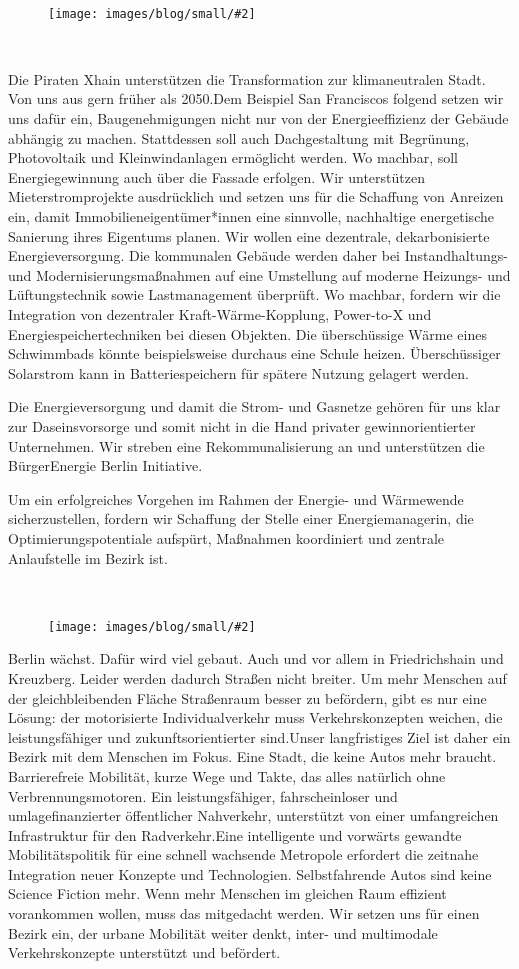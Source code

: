 \documentclass[a4paper,10pt]{article}
\newcommand{\mysection}[1]{{\vspace{1cm}\noindent\color{gray}{\ttfamily\LARGE\raggedright #1}\\\medskip}}
\newcommand{\abschnitt}[2]{%
\mysection{\raggedright #1}%
\begin{figure}[t]%
\vspace*{-2.7cm}%
\hspace*{-2.1cm}%
\texttt{[image: images/blog/small/\#2]} %
\end{figure}%
}
\begin{document}
\abschnitt{}{establishment.png}
\mysection{Energiewende}
\vspace*{-1.5cm}

Die Piraten Xhain unterstützen die Transformation zur klimaneutralen
Stadt. Von uns aus gern früher als 2050.Dem Beispiel San Franciscos
folgend setzen wir uns dafür ein, Baugenehmigungen nicht nur von der
Energieeffizienz der Gebäude abhängig zu machen. Stattdessen soll auch
Dachgestaltung mit Begrünung, Photovoltaik und Kleinwindanlagen
ermöglicht werden. Wo machbar, soll Energiegewinnung auch über die
Fassade erfolgen. Wir unterstützen Mieterstromprojekte ausdrücklich und
setzen uns für die Schaffung von Anreizen ein, damit
Immobilieneigentümer*innen eine sinnvolle, nachhaltige energetische
Sanierung ihres Eigentums planen. Wir wollen eine dezentrale,
dekarbonisierte Energieversorgung. Die kommunalen Gebäude werden daher
bei Instandhaltungs- und Modernisierungsmaßnahmen auf eine Umstellung
auf moderne Heizungs- und Lüftungstechnik sowie Lastmanagement
überprüft. Wo machbar, fordern wir die Integration von dezentraler
Kraft-Wärme-Kopplung, Power-to-X und Energiespeichertechniken bei diesen
Objekten. Die überschüssige Wärme eines Schwimmbads könnte
beispielsweise durchaus eine Schule heizen. Überschüssiger Solarstrom
kann in Batteriespeichern für spätere Nutzung gelagert werden.

Die Energieversorgung und damit die Strom- und Gasnetze gehören für uns
klar zur Daseinsvorsorge und somit nicht in die Hand privater
gewinnorientierter Unternehmen. Wir streben eine Rekommunalisierung an
und unterstützen die BürgerEnergie Berlin Initiative.

Um ein erfolgreiches Vorgehen im Rahmen der Energie- und Wärmewende
sicherzustellen, fordern wir Schaffung der Stelle einer
Energiemanagerin, die Optimierungspotentiale aufspürt, Maßnahmen
koordiniert und zentrale Anlaufstelle im Bezirk ist.

\clearpage
\abschnitt{Verkehr}{GefahrengebietA100}

Berlin wächst. Dafür wird viel gebaut. Auch und vor allem in
Friedrichshain und Kreuzberg. Leider werden dadurch Straßen nicht
breiter. Um mehr Menschen auf der gleichbleibenden Fläche Straßenraum
besser zu befördern, gibt es nur eine Lösung: der motorisierte
Individualverkehr muss Verkehrskonzepten weichen, die leistungsfähiger
und zukunftsorientierter sind.Unser langfristiges Ziel ist daher ein
Bezirk mit dem Menschen im Fokus. Eine Stadt, die keine Autos mehr
braucht. Barrierefreie Mobilität, kurze Wege und Takte, das alles
natürlich ohne Verbrennungsmotoren. Ein leistungsfähiger,
fahrscheinloser und umlagefinanzierter öffentlicher Nahverkehr,
unterstützt von einer umfangreichen Infrastruktur für den
Radverkehr.Eine intelligente und vorwärts gewandte Mobilitätspolitik für
eine schnell wachsende Metropole erfordert die zeitnahe Integration
neuer Konzepte und Technologien. Selbstfahrende Autos sind keine Science
Fiction mehr. Wenn mehr Menschen im gleichen Raum effizient vorankommen
wollen, muss das mitgedacht werden. Wir setzen uns für einen Bezirk ein,
der urbane Mobilität weiter denkt, inter- und multimodale
Verkehrskonzepte unterstützt und befördert.
\end{document}
